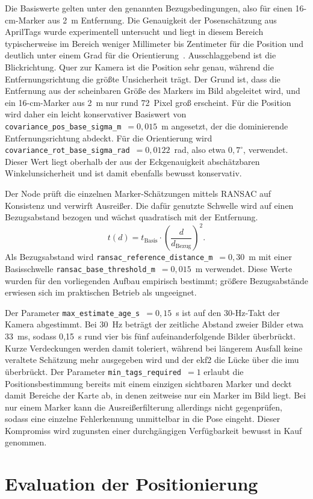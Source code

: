 Die Basiswerte gelten unter den genannten Bezugsbedingungen, also für einen 16-cm-Marker aus 2~m Entfernung.
Die Genauigkeit der Posenschätzung aus AprilTags wurde experimentell untersucht und liegt in diesem Bereich typischerweise im Bereich weniger Millimeter bis Zentimeter für die Position und deutlich unter einem Grad für die Orientierung~\cite{Kalaitzakis2021}.
Ausschlaggebend ist die Blickrichtung.
Quer zur Kamera ist die Position sehr genau, während die Entfernungsrichtung die größte Unsicherheit trägt.
Der Grund ist, dass die Entfernung aus der scheinbaren Größe des Markers im Bild abgeleitet wird, und ein 16-cm-Marker aus 2~m nur rund 72~Pixel groß erscheint.
Für die Position wird daher ein leicht konservativer Basiswert von \texttt{covariance\_pos\_base\_sigma\_m}~$=0{,}015$~m angesetzt, der die dominierende Entfernungsrichtung abdeckt.
Für die Orientierung wird \texttt{covariance\_rot\_base\_sigma\_rad}~$=0{,}0122$~rad, also etwa $0{,}7^\circ$, verwendet.
Dieser Wert liegt oberhalb der aus der Eckgenauigkeit abschätzbaren Winkelunsicherheit und ist damit ebenfalls bewusst konservativ.

Der Node prüft die einzelnen Marker-Schätzungen mittels RANSAC auf Konsistenz und verwirft Ausreißer.
Die dafür genutzte Schwelle wird auf einen Bezugsabstand bezogen und wächst quadratisch mit der Entfernung.
\begin{equation}
t(d) = t_\text{Basis}\cdot\left(\frac{d}{d_\text{Bezug}}\right)^{2}.
\label{eq:ransac_scaling}
\end{equation}
Als Bezugsabstand wird \texttt{ransac\_reference\_distance\_m}~$=0{,}30$~m mit einer Basisschwelle \texttt{ransac\_base\_threshold\_m}~$=0{,}015$~m verwendet.
Diese Werte wurden für den vorliegenden Aufbau empirisch bestimmt; größere Bezugsabstände erwiesen sich im praktischen Betrieb als ungeeignet.

Der Parameter \texttt{max\_estimate\_age\_s}~$=0{,}15$~s ist auf den 30-Hz-Takt der Kamera abgestimmt.
Bei 30~Hz beträgt der zeitliche Abstand zweier Bilder etwa 33~ms, sodass 0{,}15~s rund vier bis fünf aufeinanderfolgende Bilder überbrückt.
Kurze Verdeckungen werden damit toleriert, während bei längerem Ausfall keine veraltete Schätzung mehr ausgegeben wird und der \gls{ekf2} die Lücke über die \gls{imu} überbrückt.
Der Parameter \texttt{min\_tags\_required}~$=1$ erlaubt die Positionsbestimmung bereits mit einem einzigen sichtbaren Marker und deckt damit Bereiche der Karte ab, in denen zeitweise nur ein Marker im Bild liegt.
Bei nur einem Marker kann die Ausreißerfilterung allerdings nicht gegenprüfen, sodass eine einzelne Fehlerkennung unmittelbar in die Pose eingeht.
Dieser Kompromiss wird zugunsten einer durchgängigen Verfügbarkeit bewusst in Kauf genommen.



\section{Evaluation der Positionierung}
